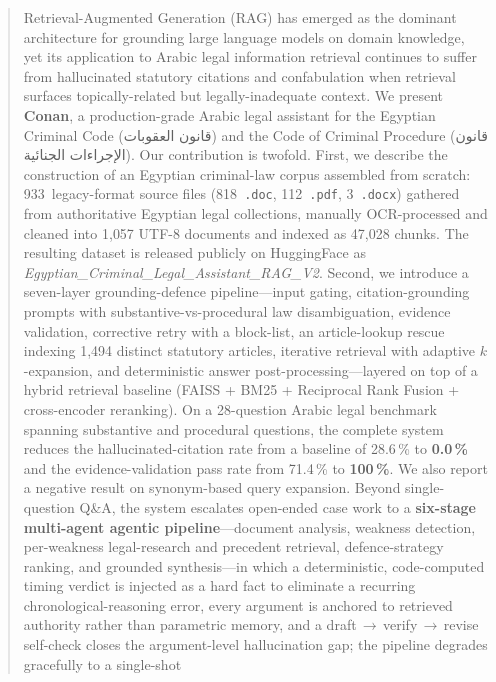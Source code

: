 \documentclass[final,1p,times]{elsarticle}
\newcommand{\ar}[1]{{\arabicfont\beginR #1\endR}}
\begin{document}
\begin{frontmatter}
\begin{abstract}
Retrieval-Augmented Generation (RAG) has emerged as the dominant architecture
for grounding large language models on domain knowledge, yet its application
to Arabic legal information retrieval continues to suffer from hallucinated
statutory citations and confabulation when retrieval surfaces topically-related
but legally-inadequate context. We present \textbf{Conan}, a production-grade
Arabic legal assistant for the Egyptian Criminal Code (\ar{قانون العقوبات})
and the Code of Criminal Procedure (\ar{قانون الإجراءات الجنائية}). Our
contribution is twofold. First, we describe the construction of an Egyptian
criminal-law corpus assembled from scratch: 933~legacy-format source files
(818~\texttt{.doc}, 112~\texttt{.pdf}, 3~\texttt{.docx}) gathered from
authoritative Egyptian legal collections, manually OCR-processed and cleaned
into 1{,}057 UTF-8 documents and indexed as 47{,}028 chunks. The resulting
dataset is released publicly on HuggingFace as
\emph{Egyptian\_Criminal\_Legal\_Assistant\_RAG\_V2}. Second, we introduce a
seven-layer grounding-defence pipeline---input gating, citation-grounding
prompts with substantive-vs-procedural law disambiguation, evidence
validation, corrective retry with a block-list, an article-lookup rescue
indexing 1{,}494 distinct statutory articles, iterative retrieval with
adaptive $k$-expansion, and deterministic answer post-processing---layered on
top of a hybrid retrieval baseline (FAISS + BM25 + Reciprocal Rank Fusion +
cross-encoder reranking). On a 28-question Arabic legal benchmark spanning
substantive and procedural questions, the complete system reduces the
hallucinated-citation rate from a baseline of 28.6\,\% to \textbf{0.0\,\%} and
the evidence-validation pass rate from 71.4\,\% to \textbf{100\,\%}. We also
report a negative result on synonym-based query expansion. Beyond
single-question Q\&A, the system escalates open-ended case work to a
\textbf{six-stage multi-agent agentic pipeline}---document analysis, weakness
detection, per-weakness legal-research and precedent retrieval, defence-strategy
ranking, and grounded synthesis---in which a deterministic, code-computed timing
verdict is injected as a hard fact to eliminate a recurring chronological-reasoning
error, every argument is anchored to retrieved authority rather than parametric
memory, and a draft\,$\rightarrow$\,verify\,$\rightarrow$\,revise self-check closes the
argument-level hallucination gap; the pipeline degrades gracefully to a single-shot

\end{abstract}
\end{frontmatter}
\end{document}
